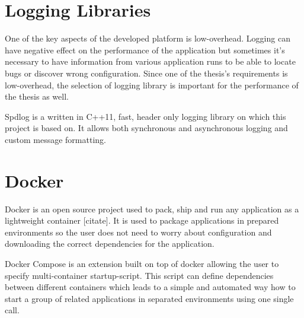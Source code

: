 \section{Logging Libraries}
One of the key aspects of the developed platform is low-overhead. Logging can have negative effect on the performance of the application but sometimes it's necessary to have information from various application runs to be able to locate bugs or discover wrong configuration. Since one of the thesis's requirements is low-overhead, the selection of logging library is important for the performance of the thesis as well. 

Spdlog is a written in C++11, fast, header only logging library on which this project is based on. It allows both synchronous and asynchronous logging and custom message formatting.
\section{Docker}
Docker is an open source project used to pack, ship and run any application as a lightweight container [citate]. It is used to package applications in prepared environments so the user does not need to worry about configuration and downloading the correct dependencies for the application. 

Docker Compose is an extension built on top of docker allowing the user to specify multi-container startup-script. This script can define dependencies between different containers which leads to a simple and automated way how to start a group of related applications in separated environments using one single call. 

